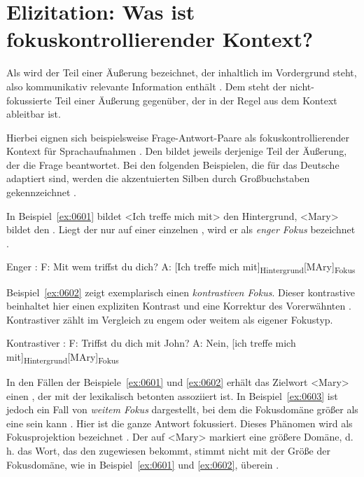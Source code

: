 \section{Elizitation: Was ist fokuskontrollierender Kontext?}
\label{sec:0601}

Als  wird der Teil einer Äußerung bezeichnet, der inhaltlich im Vordergrund steht, also kommunikativ relevante Information enthält \citep[vgl.][]{Lambrecht1994, Uhmann1991, Krifka2008}. Dem steht der nicht-fokussierte Teil einer Äußerung gegenüber, der in der Regel aus dem Kontext ableitbar ist.

Hierbei eignen sich beispielsweise Frage-Antwort-Paare als fokuskontrollierender Kontext für Sprachaufnahmen \citep[u.a.][]{Uhmann1991, Wagner2012, Krifka2008, Culicover1983, Büring2003}. Den  bildet jeweils derjenige Teil der Äußerung, der die Frage beantwortet. Bei den folgenden Beispielen, die für das Deutsche adaptiert sind, werden die akzentuierten Silben durch Großbuchstaben gekennzeichnet \citep{Mücke2014b}.

In Beispiel~\ref{ex:0601} bildet <Ich treffe mich mit> den Hintergrund, <Mary> bildet den . Liegt der  nur auf einer einzelnen , wird er als \textit{enger Fokus} bezeichnet \citep[vgl.][]{Ladd1980}.

\begin{exe}
	\ex Enger :\label{ex:0601}
	\sn F: Mit wem triffst du dich?
	\sn A: [Ich treffe mich mit]\textsubscript{Hintergrund}[MAry]\textsubscript{Fokus}
\end{exe}

Beispiel~\ref{ex:0602} zeigt exemplarisch einen \textit{kontrastiven Fokus}. Dieser kontrastive  beinhaltet hier einen expliziten Kontrast und eine Korrektur des Vorerwähnten \citep[vgl.][]{Wagner2012}. Kontrastiver  zählt im Vergleich zu engem oder weitem  als eigener Fokustyp.

\begin{exe}
	\ex Kontrastiver :\label{ex:0602}
	\sn F: Triffst du dich mit John?
	\sn A: Nein, [ich treffe mich mit]\textsubscript{Hintergrund}[MAry]\textsubscript{Fokus}
\end{exe}

In den Fällen der Beispiele~\ref{ex:0601} und \ref{ex:0602} erhält das Zielwort <Mary> einen , der mit der lexikalisch betonten  assoziiert ist. In Beispiel~\ref{ex:0603} ist jedoch ein Fall von \textit{weitem Fokus} dargestellt, bei dem die Fokusdomäne größer als eine  sein kann \citep[vgl.][]{Ladd1980}. Hier ist die ganze Antwort fokussiert. Dieses Phänomen wird als Fokusprojektion bezeichnet \citep[vgl.][]{Büring2003, Welby2003}. Der  auf <Mary> markiert eine größere Domäne, d.\,h. das Wort, das den  zugewiesen bekommt, stimmt nicht mit der Größe der Fokusdomäne, wie in Beispiel~\ref{ex:0601} und \ref{ex:0602}, überein \citep[vgl.][]{Uhmann1991, Fery1993}.

